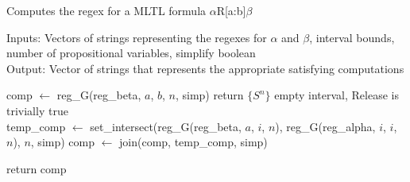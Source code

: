 \documentclass[runningheads]{llncs}
\begin{document}
\begin{algorithm}[H]
\caption{Computes the regex for a MLTL formula $\alpha$R[a:b]$\beta$}
Inputs: Vectors of strings representing the regexes for $\alpha$ and $\beta$, interval bounds, number of propositional variables, simplify boolean\\
Output: Vector of strings that represents the appropriate satisfying computations 
\begin{algorithmic}

    \State comp $\leftarrow$ reg\_G(reg\_beta, $a$, $b$, $n$, simp)
        \State return $\{S^n\}$
        \Comment empty interval, Release is trivially true
    \EndIf
     \\
        \State temp\_comp $\leftarrow$ set\_intersect(reg\_G(reg\_beta, $a$, $i$, $n$), reg\_G(reg\_alpha, $i$, $i$, $n$), $n$, simp)
        \State comp $\leftarrow$ join(comp, temp\_comp, simp)
    \EndFor
    
    \State return comp
\EndProcedure
\end{algorithmic}
\end{algorithm}
\end{document}
